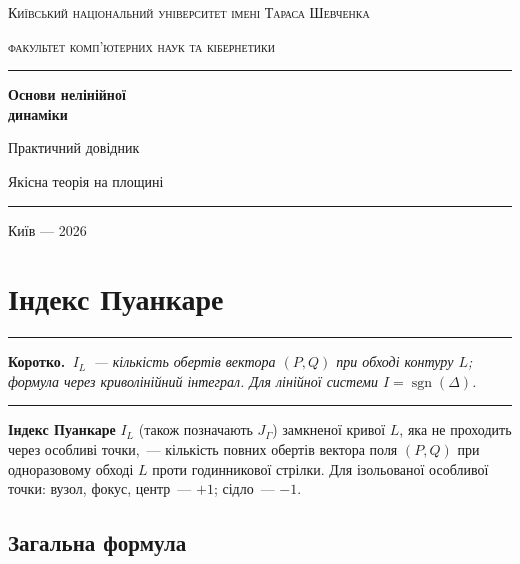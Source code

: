 \documentclass[12pt,a4paper]{article}
\DeclareMathOperator{\sgn}{sgn}
\newenvironment{korotko}
  {\par\medskip\noindent\begingroup\color{accent!75!black}\rule{\linewidth}{0.4pt}\par
   \noindent\textbf{Коротко.}\itshape\,}
  {\par\noindent\rule{\linewidth}{0.4pt}\endgroup\medskip}
\begin{document}
\begin{titlepage}
\thispagestyle{empty}
\centering
\vspace*{1cm}
{\scshape\large Київський національний університет імені Тараса Шевченка\par}
{\scshape факультет комп'ютерних наук та кібернетики\par}
\vspace{1.5cm}
{\color{accent}\rule{\linewidth}{1.2pt}\par}
\vspace{0.6cm}
{\Huge\bfseries Основи нелінійної\\[0.25em] динаміки\par}
\vspace{0.5cm}
{\LARGE Практичний довідник\par}
\vspace{0.35cm}
{\large Якісна теорія на площині\par}
\vspace{0.4cm}
{\color{accent}\rule{\linewidth}{1.2pt}\par}
\vfill
{\small Київ --- 2026\par}
\end{titlepage}

\tableofcontents
\newpage

\section{Індекс Пуанкаре}

\begin{korotko}
$I_L$~--- кількість обертів вектора $(P,Q)$ при обході контуру $L$;
формула через криволінійний інтеграл. Для лінійної системи $I=\sgn(\Delta)$.
\end{korotko}

\textbf{Індекс Пуанкаре} $I_L$ (також позначають $J_\Gamma$) замкненої кривої $L$,
яка не проходить через особливі точки,~--- кількість повних обертів вектора поля
$(P,Q)$ при одноразовому обході $L$ проти годинникової стрілки.
Для ізольованої особливої точки: вузол, фокус, центр~--- $+1$; сідло~--- $-1$.

\subsection{Загальна формула}
\end{document}

